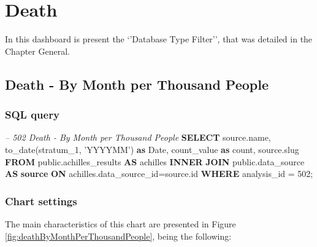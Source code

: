 \documentclass[]{book}
\newenvironment{Shaded}{\begin{snugshade}}{\end{snugshade}}
\newcommand{\KeywordTok}[1]{\textcolor[rgb]{0.13,0.29,0.53}{\textbf{#1}}}
\newcommand{\DataTypeTok}[1]{\textcolor[rgb]{0.13,0.29,0.53}{#1}}
\newcommand{\DecValTok}[1]{\textcolor[rgb]{0.00,0.00,0.81}{#1}}
\newcommand{\StringTok}[1]{\textcolor[rgb]{0.31,0.60,0.02}{#1}}
\newcommand{\CommentTok}[1]{\textcolor[rgb]{0.56,0.35,0.01}{\textit{#1}}}
\newcommand{\FunctionTok}[1]{\textcolor[rgb]{0.00,0.00,0.00}{#1}}
\newcommand{\NormalTok}[1]{#1}
\begin{document}
\chapter{Death}\label{death}

In this dashboard is present the `'Database Type Filter'', that was
detailed in the Chapter General.

\section{Death - By Month per Thousand
People}\label{death---by-month-per-thousand-people}

\subsection{SQL query}\label{sql-query-14}

\begin{Shaded}
\begin{Highlighting}[]
\CommentTok{-- 502  Death - By Month per Thousand People}
\KeywordTok{SELECT}\NormalTok{ source.name,}
       \FunctionTok{to_date}\NormalTok{(stratum_1, }\StringTok{'YYYYMM'}\NormalTok{) }\KeywordTok{as} \DataTypeTok{Date}\NormalTok{,}
\NormalTok{       count_value }\KeywordTok{as} \FunctionTok{count}\NormalTok{, }
\NormalTok{       source.slug}
\KeywordTok{FROM}\NormalTok{ public.achilles_results }\KeywordTok{AS}\NormalTok{ achilles }
    \KeywordTok{INNER} \KeywordTok{JOIN}\NormalTok{ public.data_source }\KeywordTok{AS} \KeywordTok{source} \KeywordTok{ON} 
\NormalTok{      achilles.data_source_id=source.id}
\KeywordTok{WHERE}\NormalTok{ analysis_id = }\DecValTok{502}\NormalTok{;}
\end{Highlighting}
\end{Shaded}

\subsection{Chart settings}\label{chart-settings-14}

The main characteristics of this chart are presented in Figure
\ref{fig:deathByMonthPerThousandPeople}, being the following:
\end{document}
